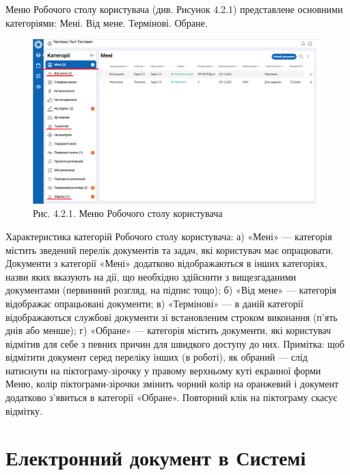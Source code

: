 Меню Робочого столу користувача (див. Рисунок 4.2.1) представлене основними
категоріями: Мені. Від мене. Термінові. Обране.

\begin{figure}[!htbp]
\centerline{\includegraphics[width=\textwidth]{img/4.2.1.png}}
\caption{Рис. 4.2.1. Меню Робочого столу користувача}
\end{figure}

Характеристика категорій Робочого столу користувача:
 а) «Мені» --- категорія містить зведений перелік документів та задач, які
користувач має опрацювати. Документи з категорії «Мені» додатково
відображаються в інших категоріях, назви яких вказують на дії, що необхідно
здійснити з вищезгаданими документами (первинний розгляд, на підпис тощо);
 б) «Від мене» --- категорія відображає опрацьовані документи;
 в) «Термінові» --- в даній категорії відображаються службові документи зі
встановленим строком виконання (п’ять днів або менше);
 г) «Обране» --- категорія містить документи, які користувач відмітив для себе
з певних причин для швидкого доступу до них.
 Примітка: щоб відмітити документ серед переліку інших (в роботі), як обраний ---
слід натиснути на піктограму-зірочку у правому верхньому куті екранної форми Меню,
колір піктограми-зірочки змінить чорний колір на оранжевий і документ додатково
з’явиться в категорії «Обране». Повторний клік на піктограму скасує відмітку.

\section{Електронний документ в Системі}

